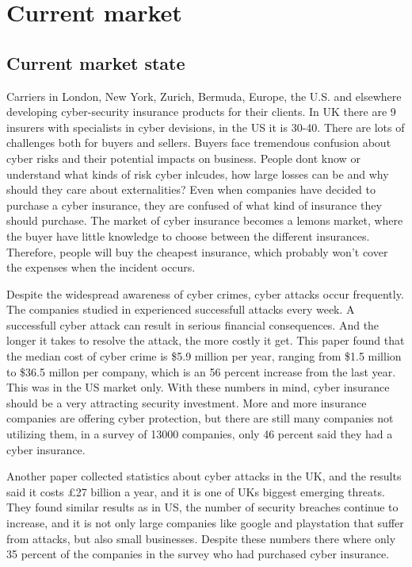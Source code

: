 \chapter{Current market}
\label{chp:hvahardenneaasi??} 
\section{Current market state}
Carriers in London, New York, Zurich, Bermuda, Europe, the U.S. and 
elsewhere developing cyber-security insurance products for their clients.
In UK there are 9 insurers with specialists in cyber devisions, 
in the US it is 30-40. \cite{evolvingcyber}
There are lots of challenges both for buyers and sellers. 
Buyers face tremendous confusion about cyber risks and their potential impacts on business. 
People dont know or understand what kinds of risk cyber inlcudes, 
how large losses can be and why should they care about externalities?
\cite{Cyberworkshop} 
Even when companies have decided to purchase a cyber insurance, they are confused of what kind of insurance they should purchase.
The market of cyber insurance becomes a lemons market, where the buyer have little knowledge to choose between the different insurances. 
Therefore, people will buy the cheapest insurance, which probably won't cover the expenses when the incident occurs. 

Despite the widespread awareness of cyber crimes, cyber attacks occur frequently. 
The companies studied in \cite{ccost} experienced successfull attacks every week.
 A successfull cyber attack can result in serious financial consequences. 
 And the longer it takes to resolve the attack, the more costly it get. 
 This paper found that the median cost of cyber crime is \$5.9 million per year, 
 ranging from \$1.5 million to \$36.5 millon per company, 
 which is an 56 percent increase from the last year. This was in the US market only. 
 With these numbers in mind, cyber insurance should be a very attracting security investment. 
 More and more insurance companies are offering cyber protection,
  but there are still many companies not utilizing them, in a survey of 13000 companies, 
  only 46 percent said they had a cyber insurance. \cite{compworld} 

Another paper \cite{evolvingcyber} collected statistics about cyber attacks in the UK, and the results said it costs \pounds 27
 billion a year, and it is one of UKs biggest emerging threats. They found similar results as in US,
  the number of security breaches continue to increase, and it is not only large companies like google
   and playstation that suffer from attacks, but also small businesses. Despite these numbers
    there where only 35 percent of the companies in the survey who had purchased cyber insurance. 

